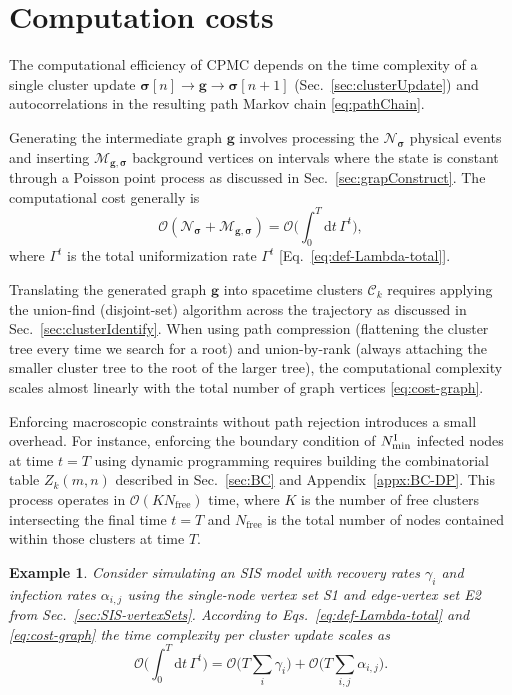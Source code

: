 \documentclass[english,10pt,aps,pra,twocolumn,superscriptaddress,floatfix,fleqn]{revtex4-2}
\newcommand{\ud}{\mathrm{d}}
\newcommand{\mc}[1]{\mathcal{#1}}
\renewcommand{\vec}[1]{{\boldsymbol{#1}}}
\newcommand{\C} {\mc{C}}
\renewcommand{\O} {\mc{O}}
\newcommand{\vg}{\vec{g}}
\newcommand{\vs}{\vec{\sigma}}
\newcommand{\Np}{\mc{N}}
\newcommand{\Nb}{\mc{M}}
\newcommand{\tI}{\textnormal{I}}
\newtheorem{example}{Example}
\begin{document}
\section{Computation costs}\label{sec:costs}
The computational efficiency of CPMC depends on the time complexity of a single cluster update $\vs[n] \to \vg \to \vs[n+1]$ (Sec.~\ref{sec:clusterUpdate}) and autocorrelations in the resulting path Markov chain \eqref{eq:pathChain}.

Generating the intermediate graph $\vg$ involves processing the $\Np_\vs$ physical events and inserting $\Nb_{\vg,\vs}$ background vertices on intervals where the state is constant through a Poisson point process as discussed in Sec.~\ref{sec:grapConstruct}. The computational cost generally is
\begin{equation}\label{eq:cost-graph}\textstyle
	\O(\Np_\vs+\Nb_{\vg,\vs})=\O\big(\int_0^T\ud t\,\Gamma^t\big),
\end{equation}
where $\Gamma^t$ is the total uniformization rate $\Gamma^t$ [Eq.~\eqref{eq:def-Lambda-total}].

Translating the generated graph $\vg$ into spacetime clusters $\C_k$ requires applying the union-find (disjoint-set) algorithm across the trajectory as discussed in Sec.~\ref{sec:clusterIdentify}. When using path compression (flattening the cluster tree every time we search for a root) and union-by-rank (always attaching the smaller cluster tree to the root of the larger tree), the computational complexity scales almost linearly with the total number of graph vertices \eqref{eq:cost-graph}.

Enforcing macroscopic constraints without path rejection introduces a small overhead. For instance, enforcing the boundary condition of $N^\tI_{\min}$ infected nodes at time $t=T$ using dynamic programming requires building the combinatorial table $Z_k(m,n)$ described in Sec.~\ref{sec:BC} and Appendix~\ref{appx:BC-DP}. This process operates in $\O(K N_\text{free})$ time, where $K$ is the number of free clusters intersecting the final time $t=T$ and $N_\text{free}$ is the total number of nodes contained within those clusters at time $T$.

\begin{example}
Consider simulating an SIS model with recovery rates $\gamma_i$ and infection rates $\alpha_{i,j}$ using the single-node vertex set \textup{\textsc{S1}} and edge-vertex set \textup{\textsc{E2}} from Sec.~\ref{sec:SIS-vertexSets}. According to Eqs.~\eqref{eq:def-Lambda-total} and \eqref{eq:cost-graph} the time complexity per cluster update scales as
\begin{equation}\textstyle
	\O\big(\int_0^T\ud t\,\Gamma^t\big)=\O\big(T\sum_i\gamma_i\big)+\O\big(T\sum_{i,j}\alpha_{i,j}\big).
\end{equation}
\end{example}
\end{document}
